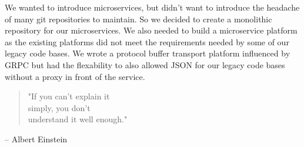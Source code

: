 \documentclass[10pt,a4paper,ragged2e,withhyper]{altacv}
\begin{document}
\begin{paracol}{2}
We wanted to introduce microservices, but didn't want to introduce the headache of many git repositories to maintain.
So we decided to create a monolithic repository for our microservices. We also needed to build a microservice platform
as the existing platforms did not meet the requirements needed by some of our legacy code bases. We wrote a protocol
buffer transport platform influenced by GRPC but had the flexability to also allowed JSON for our legacy code bases without
a proxy in front of the service.

\medskip





\switchcolumn


\begin{quote}
"If you can't explain it\\
simply, you don't\\
understand it well enough."
\end{quote}

-- Albert Einstein



\divider \smallskip

\\



\divider \smallskip


\end{paracol}
\end{document}
